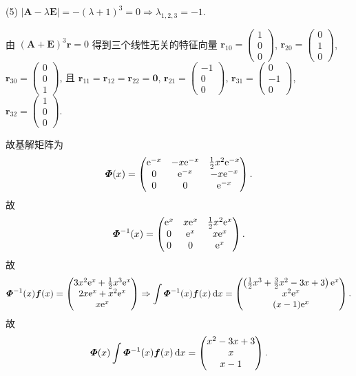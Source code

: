 \begin{solution}
  (5) $|\bm{A}-\lambda\bm{E}|=-(\lambda+1)^3=0\Rightarrow\lambda_{1,2,3}=-1$.

  由 $(\bm{A}+\bm{E})^3\bm{r}=0$ 得到三个线性无关的特征向量
  $\bm{r}_{10}=\begin{pmatrix}1\\0\\0\end{pmatrix}$,
  $\bm{r}_{20}=\begin{pmatrix}0\\1\\0\end{pmatrix}$,
  $\bm{r}_{30}=\begin{pmatrix}0\\0\\1\end{pmatrix}$, 
  且 $\bm{r}_{11}=\bm{r}_{12}=\bm{r}_{22}=\bm{0}$,
  $\bm{r}_{21}=\begin{pmatrix}-1\\0\\0\end{pmatrix}$,
  $\bm{r}_{31}=\begin{pmatrix}0\\-1\\0\end{pmatrix}$,
  $\bm{r}_{32}=\begin{pmatrix}1\\0\\0\end{pmatrix}$.

  故基解矩阵为
  \[\bm{\varPhi}(x) = 
  \begin{pmatrix}
    \mathrm{e}^{-x}&-x\mathrm{e}^{-x}&\frac{1}{2}x^2\mathrm{e}^{-x} \\
    0&\mathrm{e}^{-x}&-x\mathrm{e}^{-x} \\
    0&0&\mathrm{e}^{-x}
  \end{pmatrix}.\]
  故
  \[\bm{\varPhi}^{-1}(x) = 
  \begin{pmatrix}
    \mathrm{e}^x&x\mathrm{e}^x&\frac{1}{2}x^2\mathrm{e}^x \\
    0&\mathrm{e}^x&x\mathrm{e}^x \\
    0&0&\mathrm{e}^x
  \end{pmatrix}.\]
  故
  \[\bm{\varPhi}^{-1}(x)\bm{f}(x) =
  \begin{pmatrix}
    3x^2\mathrm{e}^x+\frac{1}{2}x^3\mathrm{e}^x \\
    2x\mathrm{e}^x+x^2\mathrm{e}^x \\
    x\mathrm{e}^x
  \end{pmatrix}\Rightarrow
  \int\bm{\varPhi}^{-1}(x)\bm{f}(x)\mathop{}\!\mathrm{d} x =
  \begin{pmatrix}
    \left(\frac{1}{2}x^3+\frac{3}{2}x^2-3x+3\right)\mathrm{e}^x \\
    x^2\mathrm{e}^x \\
    (x-1)\mathrm{e}^x
  \end{pmatrix}.\]
  故
  \[\bm{\varPhi}(x)\int\bm{\varPhi}^{-1}(x)\bm{f}(x)\mathop{}\!\mathrm{d} x=\begin{pmatrix}x^2-3x+3\\x\\x-1\end{pmatrix}.\]


\end{solution}
